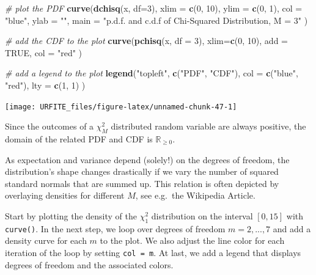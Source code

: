 \documentclass[]{book}
\newenvironment{Shaded}{\begin{snugshade}}{\end{snugshade}}
\newcommand{\KeywordTok}[1]{\textcolor[rgb]{0.13,0.29,0.53}{\textbf{#1}}}
\newcommand{\DataTypeTok}[1]{\textcolor[rgb]{0.13,0.29,0.53}{#1}}
\newcommand{\DecValTok}[1]{\textcolor[rgb]{0.00,0.00,0.81}{#1}}
\newcommand{\StringTok}[1]{\textcolor[rgb]{0.31,0.60,0.02}{#1}}
\newcommand{\CommentTok}[1]{\textcolor[rgb]{0.56,0.35,0.01}{\textit{#1}}}
\newcommand{\OtherTok}[1]{\textcolor[rgb]{0.56,0.35,0.01}{#1}}
\newcommand{\NormalTok}[1]{#1}
\theoremstyle{definition}
\theoremstyle{definition}
\theoremstyle{definition}
\theoremstyle{remark}
\begin{document}
\begin{Shaded}
\begin{Highlighting}[]
\CommentTok{# plot the PDF}
\KeywordTok{curve}\NormalTok{(}\KeywordTok{dchisq}\NormalTok{(x, }\DataTypeTok{df=}\DecValTok{3}\NormalTok{), }
      \DataTypeTok{xlim =} \KeywordTok{c}\NormalTok{(}\DecValTok{0}\NormalTok{, }\DecValTok{10}\NormalTok{), }
      \DataTypeTok{ylim =} \KeywordTok{c}\NormalTok{(}\DecValTok{0}\NormalTok{, }\DecValTok{1}\NormalTok{), }
      \DataTypeTok{col =} \StringTok{"blue"}\NormalTok{,}
      \DataTypeTok{ylab =} \StringTok{""}\NormalTok{,}
      \DataTypeTok{main =} \StringTok{"p.d.f. and c.d.f of Chi-Squared Distribution, M = 3"}
\NormalTok{      )}

\CommentTok{# add the CDF to the plot}
\KeywordTok{curve}\NormalTok{(}\KeywordTok{pchisq}\NormalTok{(x, }\DataTypeTok{df =} \DecValTok{3}\NormalTok{), }
      \DataTypeTok{xlim=}\KeywordTok{c}\NormalTok{(}\DecValTok{0}\NormalTok{, }\DecValTok{10}\NormalTok{), }
      \DataTypeTok{add =} \OtherTok{TRUE}\NormalTok{, }
      \DataTypeTok{col =} \StringTok{"red"}
\NormalTok{      )}

\CommentTok{# add a legend to the plot}
\KeywordTok{legend}\NormalTok{(}\StringTok{"topleft"}\NormalTok{, }
       \KeywordTok{c}\NormalTok{(}\StringTok{"PDF"}\NormalTok{, }\StringTok{"CDF"}\NormalTok{), }
       \DataTypeTok{col =} \KeywordTok{c}\NormalTok{(}\StringTok{"blue"}\NormalTok{, }\StringTok{"red"}\NormalTok{), }
       \DataTypeTok{lty =} \KeywordTok{c}\NormalTok{(}\DecValTok{1}\NormalTok{, }\DecValTok{1}\NormalTok{)}
\NormalTok{       )}
\end{Highlighting}
\end{Shaded}

\begin{center}\texttt{[image: URFITE\_files/figure-latex/unnamed-chunk-47-1]} \end{center}

Since the outcomes of a \(\chi^2_M\) distributed random variable are
always positive, the domain of the related PDF and CDF is
\(\mathbb{R}_{\geq0}\).

As expectation and variance depend (solely!) on the degrees of freedom,
the distribution's shape changes drastically if we vary the number of
squared standard normals that are summed up. This relation is often
depicted by overlaying densities for different \(M\), see e.g.~the
Wikipedia Article.

Start by plotting the density of the \(\chi_1^2\) distribution on the
interval \([0,15]\) with \texttt{curve()}. In the next step, we loop
over degrees of freedom \(m=2,...,7\) and add a density curve for each
\(m\) to the plot. We also adjust the line color for each iteration of
the loop by setting \texttt{col = m}. At last, we add a legend that
displays degrees of freedom and the associated colors.
\end{document}
